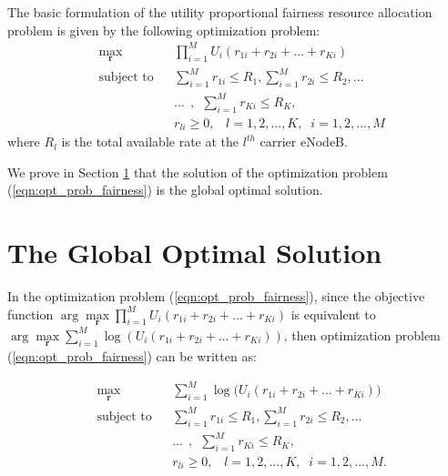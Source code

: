 \documentclass[journal]{IEEEtran} 		\usepackage{amsmath,amssymb}
\begin{document}
The basic formulation of the utility proportional fairness resource allocation problem is given by the following optimization problem:
\begin{equation}\label{eqn:opt_prob_fairness}
\begin{aligned}
& \underset{\textbf{r}}{\text{max}} & & \prod_{i=1}^{M}U_i(r_{1i} + r_{2i} + ... + r_{Ki}) \\
& \text{subject to} & & \sum_{i=1}^{M}r_{1i} \leq R_1, \sum_{i=1}^{M}r_{2i} \leq R_2, ...\\
& & & ...\:\:, \:\:\sum_{i=1}^{M}r_{Ki} \leq R_K,\\
& & & r_{li} \geq 0, \;\;\;l = 1,2, ...,K,\;\; i = 1,2, ...,M
\end{aligned}
\end{equation}
where $R_l$ is the total available rate at the $l^{th}$ carrier eNodeB.

We prove in Section \ref{sec:Proof} that the solution of the optimization problem (\ref{eqn:opt_prob_fairness}) is the global optimal solution.
\section{The Global Optimal Solution}\label{sec:Proof}

In the optimization problem (\ref{eqn:opt_prob_fairness}), since the objective function $\arg \underset{\textbf{r}} \max \prod_{i=1}^{M}U_i(r_{1i}+r_{2i}+ ...+r_{Ki})$ is equivalent to $\arg \underset{\textbf{r}} \max \sum_{i=1}^{M}\log(U_i(r_{1i}+r_{2i}+ ...+r_{Ki}))$, then optimization problem (\ref{eqn:opt_prob_fairness}) can be written as:

\begin{equation}\label{eqn:opt_prob_fairness_mod}
\begin{aligned}
& \underset{\textbf{r}}{\text{max}} & & \sum_{i=1}^{M}\log \Big(U_i(r_{1i} + r_{2i} + ... + r_{Ki})\Big) \\
& \text{subject to} & & \sum_{i=1}^{M}r_{1i} \leq R_1, \sum_{i=1}^{M}r_{2i} \leq R_2, ...\\
& & & ...\:\:, \:\:\sum_{i=1}^{M}r_{Ki} \leq R_K,\\
& & & r_{li} \geq 0, \;\;\;l = 1,2, ...,K,\;\; i = 1,2, ...,M.
\end{aligned}
\end{equation}
\end{document}
